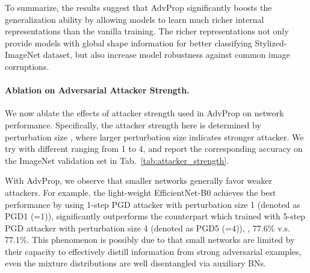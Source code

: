 \documentclass[10pt,twocolumn,letterpaper]{article}
\begin{document}
To summarize, the results suggest that AdvProp significantly boosts the  generalization ability by allowing models to learn much richer internal representations than the vanilla training. The richer representations not only provide models with global shape information for better classifying Stylized-ImageNet dataset, but also increase model robustness against common image corruptions. 


\paragraph{Ablation on Adversarial Attacker Strength.} 
We now ablate the effects of attacker strength used in AdvProp on network performance. Specifically, the attacker strength here is determined by perturbation size , where larger perturbation size indicates stronger attacker. We try with different  ranging from 1 to 4, and report the corresponding accuracy on the ImageNet validation set in Tab.~\ref{tab:attacker_strength}. 


\begin{table}[h!]
\vspace{-0.7em}
\vskip 0.05in
\caption{ImageNet performance of models trained with AdvProp and different attack strength. In general, smaller networks favor weaker attackers, while larger networks favor stronger attackers.}
\label{tab:attacker_strength}
\end{table}



With AdvProp, we observe that smaller networks generally favor weaker attackers. For example, the light-weight EfficientNet-B0 achieves the best performance by using 1-step PGD attacker with perturbation size 1 (denoted as PGD1 (=1)), significantly outperforms the counterpart which trained with 5-step PGD attacker with  perturbation size 4 (denoted as PGD5 (=4)), \ie, 77.6\% v.s. 77.1\%. 
This phenomenon is possibly due to that small networks are limited by their capacity to effectively distill information from strong adversarial examples, even the mixture distributions are well disentangled via auxiliary BNs.
\end{document}
